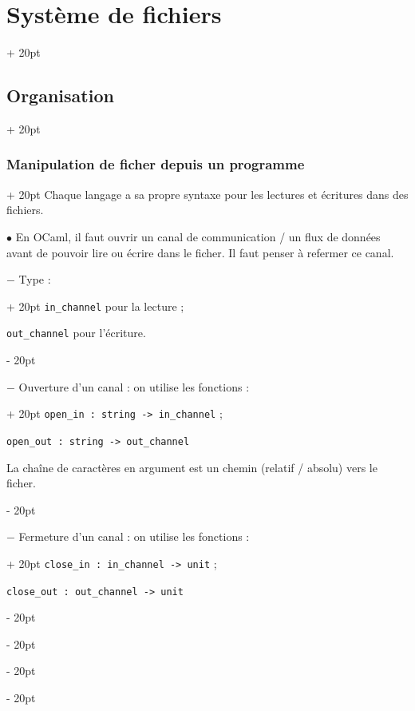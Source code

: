 \documentclass[a4paper, 12pt, twoside]{article}
\newcommand{\ind}[1][20pt]{\advance\leftskip + #1}
\newcommand{\deind}[1][20pt]{\advance\leftskip - #1}
\newenvironment{indentedenv}[1][20pt]{\par \ind[#1]}{\par \deind}
\newenvironment{indt}[2][20pt]{#2 \begin{indentedenv}[#1]}{\end{indentedenv}} %
\begin{document}
\begin{indt}{\section{Système de fichiers}}
\begin{indt}{\subsection{Organisation}}
            \begin{indt}{\subsubsection{Manipulation de ficher depuis un programme}}
                Chaque langage a sa propre syntaxe pour les lectures et écritures dans des fichiers.
                
                \vspace{12pt}
                
                $\bullet$ En OCaml, il faut ouvrir un canal de communication / un flux de données avant de pouvoir lire ou écrire dans le ficher. Il faut penser à refermer ce canal.
                
                \begin{indt}{$-$ Type :}
                    \texttt{in\_channel} pour la lecture ;
                    
                    \texttt{out\_channel} pour l'écriture.
                \end{indt}
                
                \vspace{6pt}
                
                \begin{indt}{$-$ Ouverture d'un canal : on utilise les fonctions :}
                    \texttt{open\_in : string -> in\_channel} ;
                    
                    \texttt{open\_out : string -> out\_channel}
                
                    La chaîne de caractères en argument est un chemin (relatif / absolu) vers le ficher.
                \end{indt}
                
                \vspace{6pt}
                
                \begin{indt}{$-$ Fermeture d'un canal : on utilise les fonctions :}
                    \texttt{close\_in : in\_channel -> unit} ;
                    
                    \texttt{close\_out : out\_channel -> unit}
                \end{indt}
                
                \vspace{6pt}
                

\end{indt}
\end{indt}
\end{indt}
\end{document}
